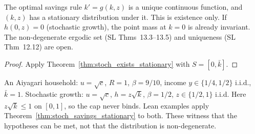 \begin{theorem}
\label{thm:stoch_savings_stationary}
\leanok
{}
The optimal savings rule $k' = g(k,z)$ is a unique continuous function, and $(k,z)$ has a stationary distribution
under it. This is existence only. If $h(0,z) = 0$ (stochastic growth), the point mass at $k = 0$ is already
invariant. The non-degenerate ergodic set (SL Thms~13.3--13.5) and uniqueness (SL Thm~12.12) are open.
\end{theorem}
\begin{proof}
\leanok
Apply Theorem~\ref{thm:stoch_exists_stationary} with $S = [0,\bar k]$.
\end{proof}

\begin{remark}[Witnesses]
\label{rem:stoch_savings_examples}
\leanok
{}
An Aiyagari household: $u = \sqrt c$, $R = 1$, $\beta = 9/10$, income $y \in \{1/4, 1/2\}$ i.i.d., $\bar k = 1$.
Stochastic growth: $u = \sqrt c$, $h = z\sqrt k$, $\beta = 1/2$, $z \in \{1/2, 1\}$ i.i.d. Here $z\sqrt k \le 1$ on $[0,1]$, so
the cap never binds. Lean examples apply Theorem~\ref{thm:stoch_savings_stationary} to both. These witness
that the hypotheses can be met, not that the distribution is non-degenerate.
\end{remark}

